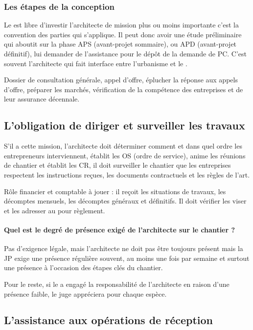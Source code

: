 		\subsubsection{Les étapes de la conception}

			Le \Mo est libre d’investir l’architecte de mission plus ou moins importante c’est la convention des parties qui s’applique. Il peut donc avoir une étude préliminaire qui aboutit sur la phase APS (avant-projet sommaire), ou APD (avant-projet définitif), lui demander de l’assistance pour le dépôt de la demande de PC. C’est souvent l’architecte qui fait interface entre l’urbanisme et le \Mo.


			Dossier de consultation générale, appel d’offre, éplucher la réponse aux appels d’offre, préparer les marchés, vérification de la compétence des entreprises et de leur assurance décennale.



	\subsection{L'obligation de diriger et surveiller les travaux}

		S’il a cette mission, l’architecte doit déterminer comment et dans quel ordre les entrepreneurs interviennent, établit les OS (ordre de service), anime les réunions de chantier et établit les CR, il doit surveiller le chantier \cad que les entreprises respectent les instructions reçues, les documents contractuels et les règles de l’art.


		Rôle financier et comptable à jouer : il reçoit les situations de travaux, les décomptes mensuels, les décomptes généraux et définitifs. Il doit vérifier les viser et les adresser au \Mo pour règlement.


		\paragraph{Quel est le degré de présence exigé de l’architecte sur le chantier ?}
		Pas d’exigence légale, mais l’architecte ne doit pas être toujours présent mais la JP exige une présence régulière souvent, au moins une fois par semaine et surtout une présence à l’occasion des étapes clés du chantier.

		Pour le reste, si le \Mo a engagé la responsabilité de l’architecte en raison d’une présence faible, le juge appréciera pour chaque espèce. \aVerifier


	\subsection{L'assistance aux opérations de réception}

